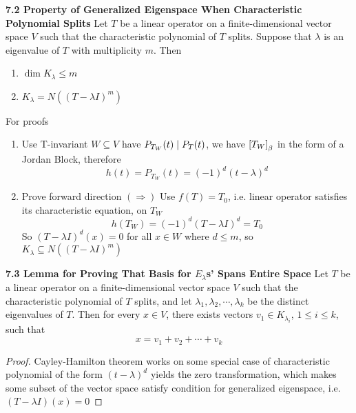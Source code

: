 \documentclass[11pt]{article}
\begin{document}
\begin{theorem*}
    \textbf{7.2 Property of Generalized Eigenspace When Characteristic Polynomial Splits} Let $T$ be a linear operator on a finite-dimensional vector space $V$ such that the characteristic polynomial of $T$ splits. Suppose that $\lambda$ is an eigenvalue of $T$ with multiplicity $m$. Then 
    \begin{enumerate}
        \item $\dim{K_{\lambda}} \leq m$ 
        \item $K_{\lambda} = N((T-\lambda I)^m)$
    \end{enumerate}
    For proofs
    \begin{enumerate}
        \item Use  T-invariant $W\subseteq V$ have $P_{T_W}(t) \mid P_T(t)$, we have $\left[ T_W \right]_{\beta}$ in the form of a Jordan Block, therefore 
        \[
            h(t) = P_{T_W}(t) = (-1)^d(t-\lambda)^d    
        \]
        \item Prove forward direction $(\Rightarrow)$ Use  $f(T) = T_0$, i.e. linear operator satisfies its characteristic equation, on $T_W$
        \[
            h(T_W) = (-1)^d (T-\lambda I)^d = T_0
        \]
        So $(T-\lambda I)^d(x) = 0$ for all $x\in W$ where $d\leq m$, so $K_{\lambda} \subseteq N((T-\lambda I)^m)$
    \end{enumerate}
\end{theorem*}
 

\begin{theorem*}
    \textbf{7.3 Lemma for Proving That Basis for $E_{\lambda}$s' Spans Entire Space} Let $T$ be a linear operator on a finite-dimensional vector space $V$ such that the characteristic polynomial of $T$ splits, and let $\lambda_1,\lambda_2,\cdots, \lambda_k$ be the distinct eigenvalues of $T$. Then for every $x\in V$, there exists vectors $v_1\in K_{\lambda_i}$, $1\leq i \leq k$, such that 
    \[ 
        x = v_1 + v_2 + \cdots + v_k    
    \]
    \begin{proof}
        Cayley-Hamilton theorem works on some special case of characteristic polynomial of the form $(t-\lambda)^d$ yields the zero transformation, which makes some subset of the vector space satisfy condition for generalized eigenspace, i.e. $(T-\lambda I)(x) = 0$
    \end{proof}
\end{theorem*}
\end{document}
